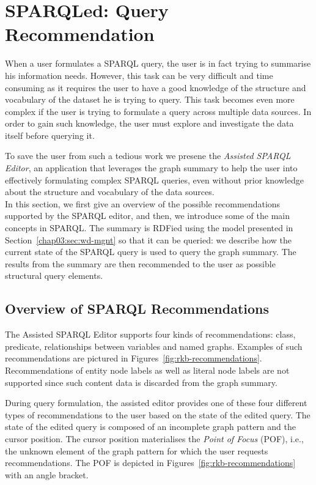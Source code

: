 \section{SPARQLed: Query Recommendation}
\label{sec:exploiting:sparqled:recommendation}

When a user formulates a SPARQL query, the user is in fact trying to summarise his information needs. However, this task can be very difficult and time consuming as it requires the user to have a good knowledge of the structure and vocabulary of the dataset he is trying to query. This task becomes even more complex if the user is trying to formulate a query across multiple data sources. In order to gain such knowledge, the user must explore and investigate the data itself before querying it.

To save the user from such a tedious work we presene the \emph{Assisted SPARQL Editor}, an application that leverages the graph summary to help the user into effectively formulating complex SPARQL queries, even without prior knowledge about the structure and vocabulary of the data sources.\\

In this section, we first give an overview of the possible recommendations supported by the SPARQL editor, and then, we introduce some of the main concepts in SPARQL. The summary is RDFied using the model presented in Section~\ref{chap03:sec:wd-mgnt} so that it can be queried: we describe how the current state of the SPARQL query is used to query the graph summary. The results from the summary are then recommended to the user as possible structural query elements.

\subsection{Overview of SPARQL Recommendations}

The Assisted SPARQL Editor supports four kinds of recommendations: class, predicate, relationships between variables and named graphs. Examples of such recommendations are pictured in Figures~\ref{fig:rkb-recommendations}. Recommendations of entity node labels as well as literal node labels are not supported since such content data is discarded from the graph summary.

During query formulation, the assisted editor provides one of these four different types of recommendations to the user based on the state of the edited query. The state of the edited query is composed of an incomplete graph pattern and the cursor position. The cursor position materialises the \emph{Point of Focus} (POF), i.e., the unknown element of the graph pattern for which the user requests recommendations. The POF is depicted in Figures~\ref{fig:rkb-recommendations} with an angle bracket.

